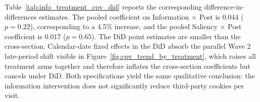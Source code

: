 \documentclass[12pt]{article}
\theoremstyle{definition}
\theoremstyle{remark}
\begin{document}
\begin{appendix}
Table~\ref{tab:info_treatment_cpv_did} reports the corresponding difference-in-differences estimates. The pooled coefficient on Information $\times$ Post is 0.044 ($p = 0.22$), corresponding to a 4.5\% increase, and the pooled Saliency $\times$ Post coefficient is 0.017 ($p = 0.65$). The DiD point estimates are smaller than the cross-section. Calendar-date fixed effects in the DiD absorb the parallel Wave 2 late-period shift visible in Figure~\ref{fig:cpv_trend_by_treatment}, which raises all treatment arms together and therefore inflates the cross-section coefficients but cancels under DiD. Both specifications yield the same qualitative conclusion: the information intervention does not significantly reduce third-party cookies per visit.

\begin{table}[H]
\centering
\caption{Effect of Information Intervention on Daily Third-Party Cookies per Visit (Difference-in-Differences)}
\label{tab:info_treatment_cpv_did}
\end{table}
\end{appendix}
\end{document}
